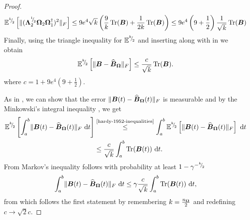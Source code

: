 \documentclass[12pt]{article}
\begin{document}
\begin{proof}
    \begin{equation}
        \mathbb{E}^{{}^{k}{\mskip -5mu/\mskip -3mu}_{2}}\left[ \lVert (\boldsymbol{\Lambda}_2^{{}^{1}{\mskip -5mu/\mskip -3mu}_{2}} \boldsymbol{\Omega}_2 \boldsymbol{\Omega}_1^{\dagger} )^2 \rVert _F \right]
        \leq 9 e^4 \sqrt{k} \left( \frac{9}{k} \operatorname{Tr}(\boldsymbol{B}) + \frac{1}{2k} \operatorname{Tr}(\boldsymbol{B}) \right) \leq  9 e^4 \left(9 + \frac{1}{2} \right) \frac{1}{\sqrt{k}} \operatorname{Tr}(\boldsymbol{B})
        \label{equ:nystrom-proof-tail-bound}
    \end{equation}
    Finally, using the triangle inequality for $\mathbb{E}^{{}^{k}{\mskip -5mu/\mskip -3mu}_{2}}$ and inserting  along with  in  we obtain
    \begin{equation}
        \mathbb{E}^{{}^{k}{\mskip -5mu/\mskip -3mu}_{2}} \left[\lVert \boldsymbol{B} - \widehat{\boldsymbol{B}}_{\boldsymbol{\Omega}} \rVert _F \right]
        \leq \frac{c}{\sqrt{k}} \operatorname{Tr}(\boldsymbol{B}).
    \end{equation}
    where $c = 1 + 9 e^4 (9 + \frac{1}{2})$.

    As in \cite{kressner-2023-randomized-lowrank}, we can show that the error $\lVert \boldsymbol{B}(t) - \widehat{\boldsymbol{B}}_{\boldsymbol{\Omega}}(t) \rVert _F$ is measurable and by the Minkowski's integral inequality \cite[theorem 202]{hardy-1952-inequalities}, we get
    \begin{align}
        \mathbb{E}^{\sfrac{k}{2}}\left[ \int_{a}^{b} \lVert \mtx{B}(t) - \Nystr{\mtx{\Omega}}{\mtx{B}}(t) \rVert _F~\mathrm{d}t \right] 
        &\stackrel{\text{\cite{hardy-1952-inequalities}}}{\leq} \int_{a}^{b} \mathbb{E}^{\sfrac{k}{2}} \left[\lVert \mtx{B}(t) - \Nystr{\mtx{\Omega}}{\mtx{B}}(t) \rVert _F \right] ~\mathrm{d}t \notag \\
        &\leq \frac{c}{\sqrt{k}} \int_{a}^{b} \Trace(\mtx{B}(t))~\mathrm{d}t.
    \end{align}
    From Markov's inequality follows with probability at least $1 - \gamma^{-{}^{k}{\mskip -5mu/\mskip -3mu}_{2}}$
    \begin{equation}
        \int_{a}^{b} \lVert \boldsymbol{B}(t) - \widehat{\boldsymbol{B}}_{\boldsymbol{\Omega}}(t) \rVert _F~\mathrm{d}t \leq \gamma \frac{c}{\sqrt{k}} \int_{a}^{b} \operatorname{Tr}(\boldsymbol{B}(t))~\mathrm{d}t,
    \end{equation}
    from which follows the first statement by remembering $k = \frac{n_{\boldsymbol{\Omega}}}{2}$ and redefining $c \to \sqrt{2}c$.


\end{proof}
\end{document}
